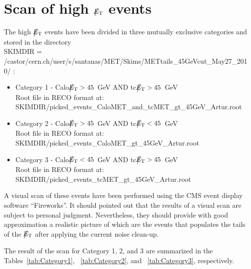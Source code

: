 \section{Scan of high $\big\slash\hspace{-1.6ex}{E_\text{T}}$ events}

The high $\big\slash\hspace{-1.6ex}{E_\text{T}}$ events have been divided in three mutually exclusive categories and stored in the directory \\ 
SKIMDIR = /castor/cern.ch/user/s/santanas/MET/Skims/METtails\_45GeVcut\_May27\_2010/ :
\begin{itemize}
\item Category 1 \quad - \quad Calo$\big\slash\hspace{-1.6ex}{E_\text{T}}>45$~GeV \quad AND \quad tc$\big\slash\hspace{-1.6ex}{E_\text{T}}>45$~GeV\\ 
Root file in RECO format at: \\ SKIMDIR/picked\_events\_CaloMET\_and\_tcMET\_gt\_45GeV\_Artur.root
\item Category 2 \quad - \quad Calo$\big\slash\hspace{-1.6ex}{E_\text{T}}>45$~GeV \quad AND \quad tc$\big\slash\hspace{-1.6ex}{E_\text{T}}<45$~GeV \\
Root file in RECO format at: \\ SKIMDIR/picked\_events\_CaloMET\_gt\_45GeV\_Artur.root
\item Category 3 \quad - \quad Calo$\big\slash\hspace{-1.6ex}{E_\text{T}}<45$~GeV \quad AND \quad tc$\big\slash\hspace{-1.6ex}{E_\text{T}}>45$~GeV \\
Root file in RECO format at: \\ SKIMDIR/picked\_events\_tcMET\_gt\_45GeV\_Artur.root
\end{itemize}

A visual scan of these events have been performed using the CMS event display
software ``Fireworks''. It should pointed out that the results of a visual scan 
are subject to personal judgment. Nevertheless, they should provide
with good approximation a realistic picture of which are the events that populates the tails
of the $\big\slash\hspace{-1.6ex}{E_\text{T}}$ after applying the current noise clean-up.

The result of the scan for Category 1, 2, and 3 are summarized 
in the Tables~\ref{tab:Category1}, ~\ref{tab:Category2}, and ~\ref{tab:Category3}, respectively.

